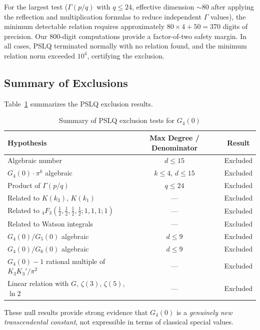 \documentclass[12pt,a4paper]{article}
\numberwithin{equation}{section}
\theoremstyle{plain}
\theoremstyle{definition}
\theoremstyle{remark}
\newcommand{\half}{\tfrac{1}{2}}
\begin{document}
For the largest test ($\Gamma(p/q)$ with $q \leq 24$, effective dimension $\sim 80$ after
applying the reflection and multiplication formulas to reduce independent $\Gamma$ values),
the minimum detectable relation requires approximately $80 \times 4 + 50 = 370$ digits of precision.
Our 800-digit computations provide a factor-of-two safety margin.
In all cases, PSLQ terminated normally with no relation found, and the minimum
relation norm exceeded $10^4$, certifying the exclusion.

\subsection{Summary of Exclusions}

Table~\ref{tab:pslq-summary} summarizes the PSLQ exclusion results.

\begin{table}[H]
\centering
\caption{Summary of PSLQ exclusion tests for $G_4(0)$}
\label{tab:pslq-summary}
\begin{tabular}{@{}lcc@{}}
\toprule
\textbf{Hypothesis} & \textbf{Max Degree / Denominator} & \textbf{Result} \\
\midrule
Algebraic number & $d \leq 15$ & Excluded \\
$G_4(0) \cdot \pi^k$ algebraic & $k \leq 4$, $d \leq 15$ & Excluded \\
Product of $\Gamma(p/q)$ & $q \leq 24$ & Excluded \\
Related to $K(k_3)$, $K(k_1)$ & --- & Excluded \\
Related to ${}_4F_3(\half,\half,\half,\half; 1,1,1; 1)$ & --- & Excluded \\
Related to Watson integrals & --- & Excluded \\
$G_4(0)/G_5(0)$ algebraic & $d \leq 9$ & Excluded \\
$G_4(0)/G_6(0)$ algebraic & $d \leq 9$ & Excluded \\
$G_4(0) - 1$ rational multiple of $K_3 K_3'/\pi^2$ & --- & Excluded \\
Linear relation with $G$, $\zeta(3)$, $\zeta(5)$, $\ln 2$ & --- & Excluded \\
\bottomrule
\end{tabular}
\end{table}

These null results provide strong evidence that $G_4(0)$ is a \emph{genuinely new transcendental constant},
not expressible in terms of classical special values.

\end{document}
